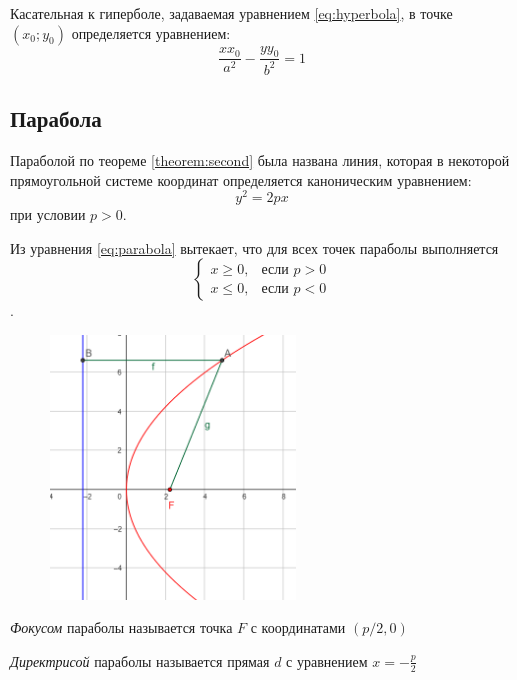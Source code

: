 Касательная к гиперболе, задаваемая уравнением \ref{eq:hyperbola}, в точке $(x_0; y_0)$ определяется уравнением:
$$
  \frac{xx_0}{a^2} - \frac{yy_0}{b^2} = 1
$$

\subsection*{Парабола}
Параболой по теореме \ref{theorem:second} была названа линия, которая в некоторой прямоугольной системе координат определяется каноническим уравнением:
\begin{equation}
  \label{eq:parabola}
  y^2 = 2px
\end{equation} при условии $p > 0$.

Из уравнения \ref{eq:parabola} вытекает, что для всех точек параболы выполняется $$\begin{cases}
  x \geq 0,& \text{если } p > 0 \\
  x \leq 0,& \text{если } p < 0
\end{cases}$$.
\begin{figure}[H]
  \centering
  \includegraphics[height = 7cm]{images/second_parabola.png}
  \label{fig:parabola}
\end{figure}

\textit{Фокусом} параболы называется точка $F$ с координатами $(p / 2, 0)$

\textit{Директрисой} параболы называется прямая $d$ с уравнением $x = -\frac{p}{2}$

